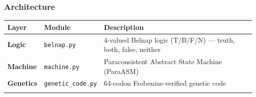 \hypertarget{architecture}{%
\subsubsection{Architecture}\label{architecture}}

\begin{longtable}[]{@{}lll@{}}
\toprule
\begin{minipage}[b]{0.23\columnwidth}\raggedright
Layer\strut
\end{minipage} & \begin{minipage}[b]{0.26\columnwidth}\raggedright
Module\strut
\end{minipage} & \begin{minipage}[b]{0.42\columnwidth}\raggedright
Description\strut
\end{minipage}\tabularnewline
\midrule
\endhead
\begin{minipage}[t]{0.23\columnwidth}\raggedright
\textbf{Logic}\strut
\end{minipage} & \begin{minipage}[t]{0.26\columnwidth}\raggedright
\texttt{belnap.py}\strut
\end{minipage} & \begin{minipage}[t]{0.42\columnwidth}\raggedright
4-valued Belnap logic (T/B/F/N) --- truth, both, false, neither\strut
\end{minipage}\tabularnewline
\begin{minipage}[t]{0.23\columnwidth}\raggedright
\textbf{Machine}\strut
\end{minipage} & \begin{minipage}[t]{0.26\columnwidth}\raggedright
\texttt{machine.py}\strut
\end{minipage} & \begin{minipage}[t]{0.42\columnwidth}\raggedright
Paraconsistent Abstract State Machine (ParaASM)\strut
\end{minipage}\tabularnewline
\begin{minipage}[t]{0.23\columnwidth}\raggedright
\textbf{Genetics}\strut
\end{minipage} & \begin{minipage}[t]{0.26\columnwidth}\raggedright
\texttt{genetic\_code.py}\strut
\end{minipage} & \begin{minipage}[t]{0.42\columnwidth}\raggedright
64-codon Frobenius-verified genetic code\strut
\end{minipage}\tabularnewline
\begin{minipage}[t]{0.23\columnwidth}\raggedright

\end{minipage}
\end{longtable}
